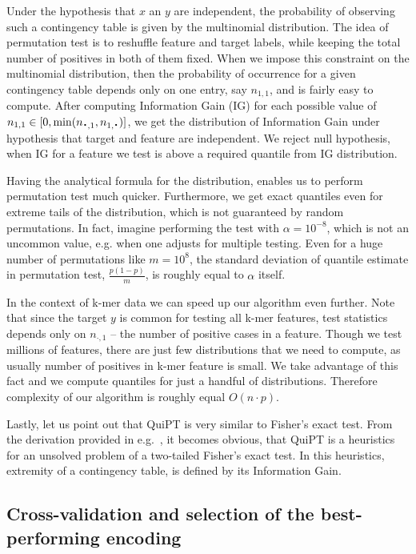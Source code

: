 \documentclass{bioinfo}
\newcommand*{\bigcdot}{\raisebox{-0.25ex}{\scalebox{1.5}{$\cdot$}}}
\begin{document}
\begin{methods}
  Under the hypothesis that $x$ an $y$ are independent, the probability of 
observing such a contingency table is given by the multinomial distribution. The 
idea of permutation test is to reshuffle feature and target labels, while 
keeping the total number of positives in both of them fixed. When we impose this 
constraint on the multinomial distribution, then the probability of occurrence 
for a given contingency table depends only on one entry, say $n_{1,1}$, and is 
fairly easy to compute. After computing Information Gain (IG) for each possible 
value of $n_{1,1} \in [0,\min(n_{\bigcdot, 1}, n_{1, \bigcdot})]$, we get the 
distribution of Information Gain under hypothesis that target and feature are 
independent. We reject null hypothesis, when IG for a feature we test is above a 
required quantile from IG distribution.

  Having the analytical formula for the distribution, enables us to perform 
permutation test much quicker. Furthermore, we get exact quantiles even for 
extreme tails of the distribution, which is not guaranteed by random 
permutations. In fact, imagine performing the test with $\alpha=10^{-8}$, which 
is not an uncommon value, e.g. when one adjusts for multiple testing. Even for a 
huge number of permutations like $m=10^8$, the standard deviation of quantile 
estimate in permutation test, $\frac{p(1-p)}{m}$, is roughly equal to $\alpha$ 
itself.

  In the context of k-mer data we can speed up our algorithm even further. Note 
that since the target $y$ is common for testing all k-mer features, test statistics 
depends only on $n_{\cdot, 1}$ -- the number of positive cases in a feature. 
Though we test millions of features, there are just few distributions that we 
need to compute, as usually number of positives in k-mer feature is small. We 
take advantage of this fact and we compute quantiles for just a handful of 
distributions. Therefore complexity of our algorithm is roughly equal $O(n\cdot 
p)$.

  Lastly, let us point out that QuiPT is very similar to Fisher's exact test. 
From the derivation provided in e.g.~\citep{lehmann_testing_2008}, it becomes 
obvious, that QuiPT is a heuristics for an unsolved problem of a two-tailed 
Fisher's exact test. In this heuristics, extremity of a contingency table, is 
defined by its Information Gain.

\subsection{Cross-validation and selection of the best-performing encoding}


\end{methods}
\end{document}
